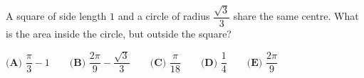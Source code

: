 A square of side length $1$ and a circle of radius $\dfrac{\sqrt{3}}{3}$ share the same centre. What is the area inside the circle, but outside the square?

$\textbf{(A) }\dfrac{\pi}{3}-1\qquad\textbf{(B) }\dfrac{2\pi}{9}-\dfrac{\sqrt{3}}{3}\qquad\textbf{(C) }\dfrac{\pi}{18}\qquad\textbf{(D) }\dfrac{1}{4}\qquad\textbf{(E) }\dfrac{2\pi}{9}$
